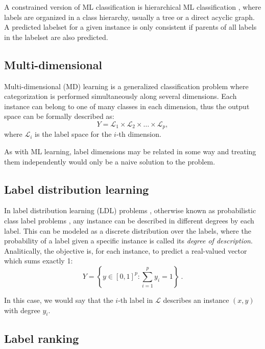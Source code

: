   A constrained version of ML classification is hierarchical ML classification \cite{hierarchical}, where labels are organized in a class hierarchy, usually a tree or a direct acyclic graph. A predicted labelset for a given instance is only consistent if parents of all labels in the labelset are also predicted.
  

\subsection{Multi-dimensional}
\label{p3sec:mdim}

Multi-dimensional (MD) learning \cite{mdc} is a generalized classification problem where categorization is performed simultaneously along several dimensions. Each instance can belong to one of many classes in each dimension, thus the output space can be formally described as:
\begin{equation}
  Y=\mathcal L_1\times\mathcal L_2\times\dots\times\mathcal L_p,
  \end{equation}
where $\mathcal L_i$ is the label space for the $i$-th dimension. 

As with ML learning, label dimensions may be related in some way and treating them independently would only be a naive solution to the problem.

\subsection{Label distribution learning}
\label{p3sec:ldl}

In label distribution learning (LDL) problems \cite{ldl}, otherwise known as probabilistic class label problems \cite{ldl-prob}, any instance can be described in different degrees by each label. This can be modeled as a discrete distribution over the labels, where the probability of a label given a specific instance is called its \emph{degree of description}. Analitically, the objective is, for each instance, to predict a real-valued vector which sums exactly 1:
\begin{equation}
  Y=\left\{y\in\left[0,1\right]^p:\sum_{i=1}^p y_i = 1\right\}~.
  \end{equation}
  
In this case, we would say that the $i$-th label in $\mathcal L$ describes an instance $(x, y)$ with degree $y_i$.

\subsection{Label ranking}

